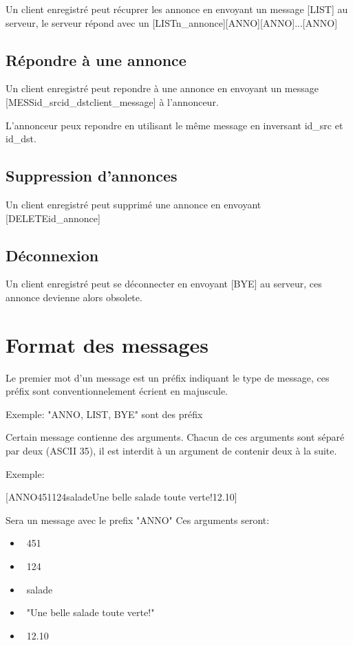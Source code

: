 \documentclass[12pt]{article}
\begin{document}
Un client enregistré peut récuprer les annonce en envoyant un message [LIST] au serveur, le serveur répond avec un [LIST\separator{}n\_annonce][ANNO][ANNO]...[ANNO]

\subsection{Répondre à une annonce}

Un client enregistré peut repondre à une annonce en envoyant un message [MESS\separator{}id\_src\separator{}id\_dst\separator{}client\_message] à l'annonceur.

L'annonceur peux repondre en utilisant le même message en inversant id\_src et id\_dst.



\subsection{Suppression d'annonces}

Un client enregistré peut supprimé une annonce en envoyant [DELETE\separator{}id\_annonce]


\subsection{Déconnexion}

Un client enregistré peut se déconnecter en envoyant [BYE] au serveur, ces annonce devienne alors obsolete.

\section{Format des messages}


Le premier mot d'un message est un préfix indiquant le type de message, ces préfix sont conventionnelement écrient en majuscule.

Exemple: "ANNO, LIST, BYE" sont des préfix

Certain message contienne des arguments. Chacun de ces arguments sont séparé par deux \separator{} (ASCII 35),
il est interdit à un argument de contenir deux \separator{} à la suite.

Exemple:

[ANNO\separator{}451\separator{}124\separator{}salade\separator{}Une belle salade toute verte!\separator{}12.10]

Sera un message avec le prefix "ANNO"
Ces arguments seront:
\begin{itemize}
  \item~451
  \item~124
  \item~salade
  \item~"Une belle salade toute verte!"
  \item~12.10
\end{itemize}
\end{document}
